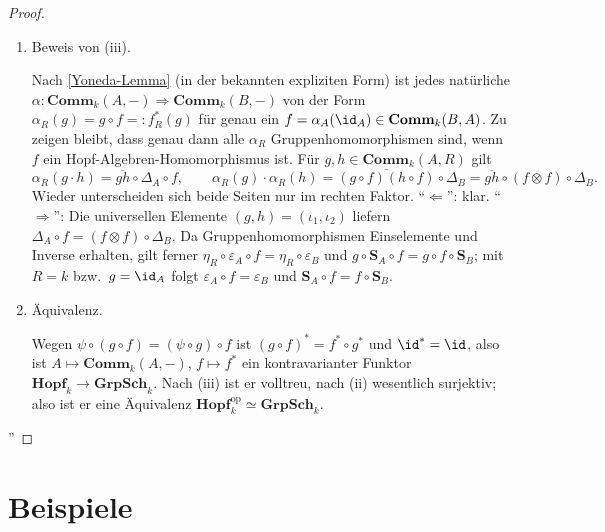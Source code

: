 \documentclass[11pt]{article}
\newcommand{\Comm}{\mathbf{Comm}}
\newcommand{\Sbold}{\mathbf{S}}
\newcommand{\GrpSch}{\mathbf{GrpSch}}
\newcommand{\Hopf}{\mathbf{Hopf}}
\begin{document}
\begin{proof}
\begin{enumerate}
        \item Beweis von (iii). \par
            Nach \ref{Yoneda-Lemma} (in der bekannten expliziten Form) ist jedes natürliche $\alpha:\Comm_k(A,-)\Rightarrow\Comm_k(B,-)$ von der Form
            $\alpha_R(g) = g\circ f =: f^*_R(g)$ für genau ein $f=\alpha_A(\id_A)\in\Comm_k(B,A)$. Zu zeigen bleibt, dass genau dann alle $\alpha_R$ Gruppenhomomorphismen sind, wenn
             $f$ ein Hopf-Algebren-Homomorphismus ist. Für $g,h\in\Comm_k(A,R)$ gilt
            $$\alpha_R(g\cdot h) = \overline{gh}\circ\Delta_A\circ f, \qquad
            \alpha_R(g)\cdot\alpha_R(h) = \overline{(g\circ f)(h\circ f)}\circ\Delta_B = \overline{gh}\circ(f\otimes f)\circ\Delta_B.$$
            Wieder unterscheiden sich beide Seiten nur im rechten Faktor. "`$\Leftarrow$"': klar.
            "`$\Rightarrow$"': Die universellen Elemente $(g,h)=(\iota_1,\iota_2)$ liefern $\Delta_A\circ f = (f\otimes f)\circ\Delta_B$.
            Da Gruppenhomomorphismen Einselemente und Inverse erhalten, gilt ferner $\eta_R\circ\varepsilon_A\circ f = \eta_R\circ\varepsilon_B$ und
            $g\circ\Sbold_A\circ f = g\circ f\circ\Sbold_B$; mit $R=k$ bzw.\ $g=\id_A$ folgt $\varepsilon_A\circ f=\varepsilon_B$ und $\Sbold_A\circ f = f\circ\Sbold_B$.

                    \item Äquivalenz. \par
            Wegen $\psi\circ(g\circ f) = (\psi\circ g)\circ f$ ist $(g\circ f)^* = f^*\circ g^*$ und $\id^*=\id$, also ist
            $A\mapsto\Comm_k(A,-)$, $f\mapsto f^*$ ein kontravarianter Funktor $\Hopf_k\to\GrpSch_k$.
            Nach (iii) ist er volltreu, nach (ii) wesentlich surjektiv; also ist er eine Äquivalenz $\Hopf_k^{\mathrm{op}}\simeq\GrpSch_k$.
        \end{enumerate}''
\end{proof}
\newpage






















\section{Beispiele}
\end{document}
